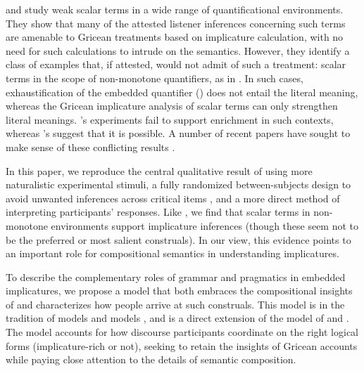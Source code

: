 \documentclass[leqno,12pt]{article}
\begin{document}
\citet{Geurts:Pouscoulous:2009} and \citet{Chemla:Spector:2011} study
weak scalar terms in a wide range of quantificational environments.
They show that many of the attested listener inferences concerning
such terms are amenable to Gricean treatments based on implicature
calculation, with no need for such calculations to intrude on the
semantics. However, they identify a class of examples that, if
attested, would not admit of such a treatment: scalar terms in the
scope of non-monotone quantifiers, as in . In such cases, exhaustification of the embedded
quantifier () does not
entail the literal meaning, whereas the Gricean implicature analysis
of scalar terms can only strengthen literal
meanings. \citeauthor{Geurts:Pouscoulous:2009}'s experiments fail to
support enrichment in such contexts, whereas
\citeauthor{Chemla:Spector:2011}'s suggest that it is possible. A
number of recent papers have sought to make sense of these conflicting
results
\citep{Clifton:Dube:2010,geurts-vantiel:2013:scalar,vanTiel:2014}.


In this paper, we reproduce the central qualitative result of
\citet{Chemla:Spector:2011} using more naturalistic experimental
stimuli, a fully randomized between-subjects design to avoid unwanted
inferences across critical items \citep{geurts-vantiel:2013:scalar},
and a more direct method of interpreting participants' responses. Like
\citeauthor{Chemla:Spector:2011}, we find that scalar terms in
non-monotone environments support implicature inferences (though these
seem not to be the preferred or most salient construals).  In our
view, this evidence points to an important role for compositional
semantics in understanding implicatures.


To describe the complementary roles of grammar and pragmatics in
embedded implicatures, we propose a model that both embraces the
compositional insights of \citeauthor{ChierchiaFoxSpector08} and
characterizes how people arrive at such construals. This model is in
the tradition of  models
\citep{Frank:Goodman:2012,Goodman:Stuhlmuller:2013} and  models \citep{Franke09DISS,Jaeger:2011}, and is a
direct extension of the  model
of \citet{Bergen:Goodman:Levy:2012} and
\citet{Bergen:Levy:Goodman:2014}. The model accounts for how discourse
participants coordinate on the right logical forms (implicature-rich
or not), seeking to retain the insights of Gricean accounts while
paying close attention to the details of semantic composition.
\end{document}
